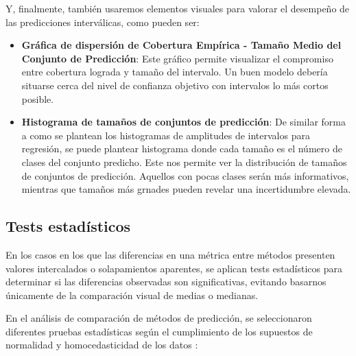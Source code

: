 Y, finalmente, también usaremos elementos visuales para valorar el desempeño de las predicciones interválicas, como pueden ser:

\begin{itemize}

    \item \textbf{Gráfica de dispersión de Cobertura Empírica - Tamaño Medio del Conjunto de Predicción}: Este gráfico permite visualizar el compromiso entre cobertura lograda y tamaño del intervalo. Un buen modelo debería situarse cerca del nivel de confianza objetivo con intervalos lo más cortos posible. 

    \item \textbf{Histograma de tamaños de conjuntos de predicción}: De similar forma a como se plantean los histogramas de amplitudes de intervalos para regresión, se puede plantear histograma donde cada tamaño es el número de clases del conjunto predicho. Este nos permite ver la distribución de tamaños de conjuntos de predicción. Aquellos con pocas clases serán más informativos, mientras que tamaños más grnades pueden revelar una incertidumbre elevada.
    
\end{itemize}


\subsection{Tests estadísticos}

En los casos en los que las diferencias en una métrica entre métodos presenten valores intercalados o solapamientos aparentes, se aplican tests estadísticos para determinar si las diferencias observadas son significativas, evitando basarnos únicamente de la comparación visual de medias o medianas.

En el análisis de comparación de métodos de predicción, se seleccionaron diferentes pruebas estadísticas según el cumplimiento de los supuestos de normalidad y homocedasticidad de los datos \cite{agbangba2024use}:

